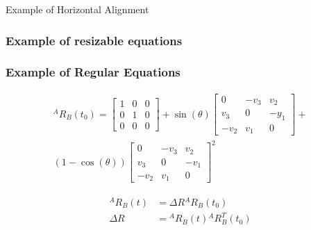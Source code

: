 \documentclass[10pt]{beamer}
\theoremstyle{remark}
\theoremstyle{definition}
\begin{document}
\begin{frame}{Example of Horizontal Alignment}
\begin{center}
\begin{minipage}[t]{.35\linewidth}
    \end{minipage}
    \end{center}
\end{frame}

\begin{frame}[allowframebreaks]
\frametitle{Example of resizable equations}

\begin{center}
\end{center}
\end{frame}

\begin{frame}[allowframebreaks]
\frametitle{Example of Regular Equations}
    
    
    \begin{equation}
        \begin{split}
        {}^AR_{B}(t_0)=\left[\begin{array}{ccc}
        1 & 0 & 0 \\
        0 & 1 & 0 \\
        0 & 0 & 0
        \end{array}\right]+
        \sin (\theta)\left[\begin{array}{ccc}
        0 & -v_{3} & v_{2} \\
        v_{3} & 0 & -y_{1} \\
        -v_{2} & v_{1} & 0
        \end{array}\right]+ \\
        (1-\cos (\theta))\left[\begin{array}{ccc}
        0 & -v_{3} & v_{2} \\
        v_{3} & 0 & -v_{1} \\
        -v_{2} & v_{1} & 0
        \end{array}\right]^{2}
        \end{split}
        \end{equation}
        
        \begin{align}
            {}^AR_{B}(t) &= \Delta R {}^AR_{B}(t_0) \\
            \Delta R &= {}^AR_{B}(t) {}^AR_{B}^T(t_0)
        \end{align}
\end{frame}
\end{document}
